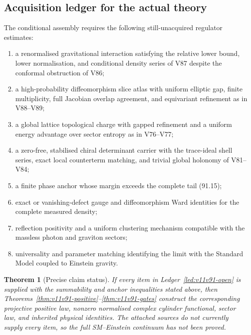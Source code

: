 \documentclass[11pt]{article}
\newtheorem{theorem}{Theorem}[section]
\begin{document}
\subsection{Acquisition ledger for the actual theory}

\begin{ledger}
\label{led:v11v91-open}
The conditional assembly requires the following still-unacquired
regulator estimates:
\begin{enumerate}
\item a renormalised gravitational interaction satisfying the
      relative lower bound, lower normalisation, and conditional
      density series of V87 despite the conformal obstruction of V86;
\item a high-probability diffeomorphism slice atlas with uniform
      elliptic gap, finite multiplicity, full Jacobian overlap
      agreement, and equivariant refinement as in V88--V89;
\item a global lattice topological charge with gapped refinement and
      a uniform energy advantage over sector entropy as in V76--V77;
\item a zero-free, stabilised chiral determinant carrier with the
      trace-ideal shell series, exact local counterterm matching, and
      trivial global holonomy of V81--V84;
\item a finite phase anchor whose margin exceeds the complete tail
      (91.15);
\item exact or vanishing-defect gauge and diffeomorphism Ward
      identities for the complete measured density;
\item reflection positivity and a uniform clustering mechanism
      compatible with the massless photon and graviton sectors;
\item universality and parameter matching identifying the limit with
      the Standard Model coupled to Einstein gravity.
\end{enumerate}
\end{ledger}

\begin{theorem}[Precise claim status]
\label{thm:v11v91-status}
If every item in Ledger~\ref{led:v11v91-open} is supplied with the
summability and anchor inequalities stated above, then
Theorems~\ref{thm:v11v91-positive}--\ref{thm:v11v91-gates} construct
the corresponding projective positive law, nonzero normalised complex
cylinder functional, sector law, and inherited physical identities.
The attached sources do not currently supply every item, so the full
SM--Einstein continuum has not been proved.
\end{theorem}
\end{document}
